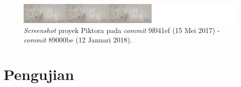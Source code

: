 \begin{enumerate}
\begin{figure}[H]
	
		\includegraphics[scale=0.3]{Gambar/Untitled-12.png}
	\caption{\textit{Screenshot} proyek Piktora pada \textit{commit} 9f041ef (15 Mei 2017) - \textit{commit} 89000be (12 Januari 2018).}
	\label{fig:c12}
\end{figure}





\end{enumerate}
\section{Pengujian}
\label{sec:pengujian}

